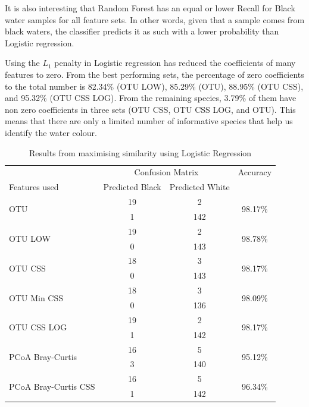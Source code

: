 It is also interesting that Random Forest has an equal or lower Recall for Black water samples for all feature sets. In other words, given that a sample comes from black waters, the classifier predicts it as such with a lower probability than Logistic regression. 

Using the $L_1$ penalty in Logistic regression has reduced the coefficients of many features to zero. From the best performing sets, the percentage of zero coefficients to the total number is 82.34\% (OTU LOW), 85.29\% (OTU), 88.95\% (OTU CSS), and 95.32\% (OTU CSS LOG). From the remaining species, 3.79\% of them have non zero coefficients in three sets (OTU CSS, OTU CSS LOG, and OTU). This means that there are only a limited number of informative species that help us identify the water colour. 


\begin{table}[!htb]
\centering
\caption{Results from maximising similarity using Logistic Regression}
\label{table:lrsimilarity}
\begin{tabular}{l c  c c}
\toprule
		&\multicolumn{2}{c}{Confusion Matrix} & Accuracy\\
Features used & Predicted Black&Predicted White&\\
\midrule
\multirow{2}{*}{OTU} &19 &2&\multirow{2}{*}{98.17\%}\\
&	 1&142&\\
\cmidrule{2-3}
\multirow{2}{*}{OTU LOW} &19 &2&\multirow{2}{*}{98.78\%}\\
&	 0&143&\\
\cmidrule{2-3}
\multirow{2}{*}{OTU CSS}&18 &3&\multirow{2}{*}{98.17\%}\\
&	 0&143&\\
\cmidrule{2-3}
\multirow{2}{*}{OTU Min CSS}&18 &3&\multirow{2}{*}{98.09\%}\\
&	 0&136&\\
\cmidrule{2-3}
\multirow{2}{*}{OTU CSS LOG}&19 &2&\multirow{2}{*}{98.17\%}\\
&	 1&142&\\
\cmidrule{2-3}
\multirow{2}{*}{PCoA Bray-Curtis} &16 &5&\multirow{2}{*}{95.12\%}\\
&	 3&140&\\
\cmidrule{2-3}
\multirow{2}{*}{PCoA Bray-Curtis CSS} &16 &5&\multirow{2}{*}{96.34\%}\\
&	 1&142&\\
\bottomrule
\end{tabular}

\end{table}


